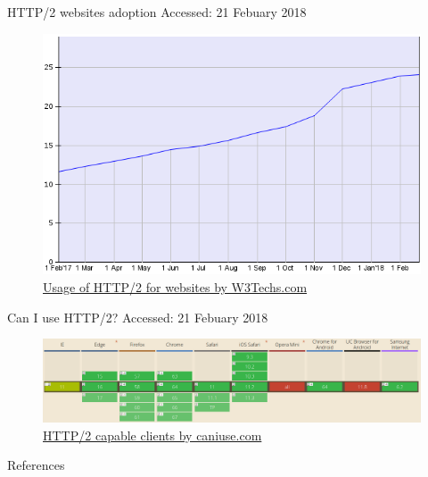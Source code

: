 \documentclass{beamer}
\begin{document}
\begin{frame}{HTTP/2 websites adoption}
	Accessed: 21 Febuary 2018
	  \begin{figure}[t]
		  \includegraphics[scale=0.4]{images/http2WebsitesUsage.png}
		  \caption{\href{https://w3techs.com/technologies/details/ce-http2/all/all}{Usage of HTTP/2 for websites by W3Techs.com}}
	  \end{figure}
\end{frame}

\begin{frame}{Can I use HTTP/2?}
	Accessed: 21 Febuary 2018
	  \begin{figure}[t]
	          \includegraphics[scale=0.25]{images/canIUseHTTP2.png}
	          \caption{\href{https://caniuse.com/\#feat=http2}{HTTP/2 capable clients by caniuse.com}}
	  \end{figure}
\end{frame}

\begin{frame}[allowframebreaks]{References}

  
  

\end{frame}
\end{document}
